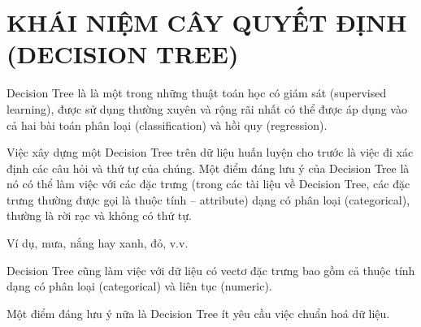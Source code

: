 \chapter{KHÁI NIỆM CÂY QUYẾT ĐỊNH (DECISION TREE)}

Decision Tree là là một trong những thuật toán học có giám sát
(supervised learning), được sử dụng thường xuyên và rộng rãi nhất
có thể được áp dụng vào cả hai bài toán phân loại (classification)
và hồi quy (regression).

Việc xây dựng một Decision Tree trên dữ liệu huấn luyện cho trước
là việc đi xác định các câu hỏi và thứ tự của chúng. Một điểm đáng
lưu ý của Decision Tree là nó có thể làm việc với các đặc trưng
(trong các tài liệu về Decision Tree, các đặc trưng thường được gọi là
thuộc tính – attribute) dạng có phân loại (categorical), thường là rời rạc
và không có thứ tự.

Ví dụ, mưa, nắng hay xanh, đỏ, v.v.

Decision Tree cũng làm việc với dữ liệu có vectơ đặc trưng bao gồm
cả thuộc tính dạng có phân loại (categorical) và liên tục (numeric).

Một điểm đáng lưu ý nữa là Decision Tree ít yêu cầu việc chuẩn hoá dữ liệu.
